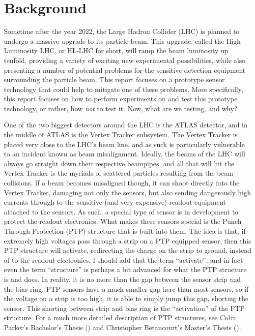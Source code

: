 \documentclass{report}
\begin{document}
     \setcounter{page}{1}
    \chapter{ Background }
        Sometime after the year 2022, the Large Hadron Collider (LHC) is planned to undergo a massive upgrade to its particle beam. This upgrade, called the High Luminosity LHC, or HL-LHC for short, will ramp the beam luminosity up tenfold, providing a variety of exciting new experimental possibilities, while also presenting a number of potential problems for the sensitive detection equipment surrounding the particle beam. This report focuses on a prototype sensor technology that could help to mitigate one of these problems. More specifically, this report focuses on how to perform experiments on and test this prototype technology, or rather, how \textit{not} to test it. Now, what are we testing, and why?
            
        One of the two biggest detectors around the LHC is the ATLAS detector, and in the middle of ATLAS is the Vertex Tracker subsystem. The Vertex Tracker is placed very close to the LHC's beam line, and as such is particularly vulnerable to an incident known as beam misalignment. Ideally, the beams of the LHC will always go straight down their respective beampipes, and all that will hit the Vertex Tracker is the myriads of scattered particles resulting from the beam collisions. If a beam becomes misaligned though, it can shoot directly into the Vertex Tracker, damaging not only the sensors, but also sending dangerously high currents through to the sensitive (and very expensive) readout equipment attached to the sensors. As such, a special type of sensor is in development to protect the readout electronics. What makes these sensors special is the Punch Through Protection (PTP) structure that is built into them. The idea is that, if extremely high voltages pass through a strip on a PTP equipped sensor, then this PTP structure will activate, redirecting the charge on the strip to ground, instead of to the readout electronics. I should add that the term ``activate'', and in fact even the term ``structure'' is perhaps a bit advanced for what the PTP structure is and does. In reality, it is no more than the gap between the sensor strip and the bias ring. PTP sensors have a much smaller gap here than most sensors, so if the voltage on a strip is too high, it is able to simply jump this gap, shorting the sensor. This shorting between strip and bias ring is the ``activation'' of the PTP structure. For a much more detailed description of PTP structures, see Colin Parker's Bachelor's Thesis (\cite{parker_thesis}) and Christopher Betancourt's Master's Thesis (\cite{betancourt_thesis}).
\end{document}
